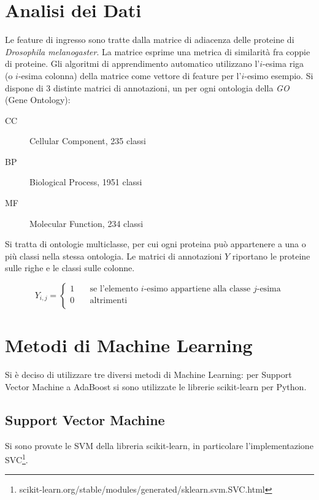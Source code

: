 \documentclass[12pt,a4paper,oneside,hidelinks]{report}
\begin{document}
\chapter{Analisi dei Dati} \label{chap:dati}
Le feature di ingresso sono tratte dalla matrice di adiacenza delle proteine di \emph{Drosophila melanogaster}. La matrice esprime una metrica di similarità fra coppie di proteine.
Gli algoritmi di apprendimento automatico utilizzano l'$ i $-esima riga (o $ i $-esima colonna) della matrice come vettore di feature per l'$ i $-esimo esempio.
Si dispone di 3 distinte matrici di annotazioni, un per ogni ontologia della \emph{GO} (Gene Ontology):
\begin{description}
\item[CC]Cellular Component, 235 classi
\item[BP]Biological Process, 1951 classi
\item[MF]Molecular Function, 234 classi
\end{description}
Si tratta di ontologie multiclasse, per cui ogni proteina può appartenere a una o più classi nella stessa ontologia.
Le matrici di annotazioni $ Y $ riportano le proteine sulle righe e le classi sulle colonne. 

\[ Y_{i,j} =
  \begin{cases}
    1       & \quad \text{se l'elemento } i \text{-esimo appartiene alla classe } j \text{-esima}\\
    0  & \quad \text{altrimenti}\\
  \end{cases}
\]




\chapter{Metodi di Machine Learning} \label{chap:metodi}
Si è deciso di utilizzare tre diversi metodi di Machine Learning: per Support Vector Machine a AdaBoost si sono utilizzate le librerie scikit-learn per Python.

\section{Support Vector Machine}
Si sono provate le SVM della libreria scikit-learn, in particolare l'implementazione SVC\footnote{scikit-learn.org/stable/modules/generated/sklearn.svm.SVC.html}.
\end{document}
